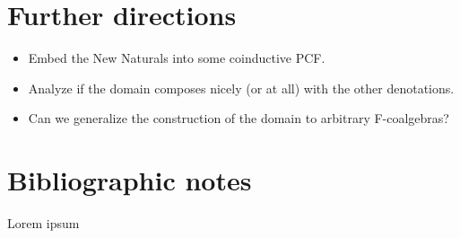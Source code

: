 \documentclass[a4paper]{article}
\begin{document}
\section{Further directions}

\begin{itemize}
\item Embed the New Naturals into some coinductive PCF.
\item Analyze if the domain composes nicely (or at all) with the other
denotations.
\item Can we generalize the construction of the domain to arbitrary
F-coalgebras?
\end{itemize}

\section{Bibliographic notes}

Lorem ipsum \cite{Pierce1991} \cite{Gunter1992} \cite{Bird1997}
\cite{Mitchell1996} \cite{Allison1986} \cite{Capretta2002}



\end{document}
